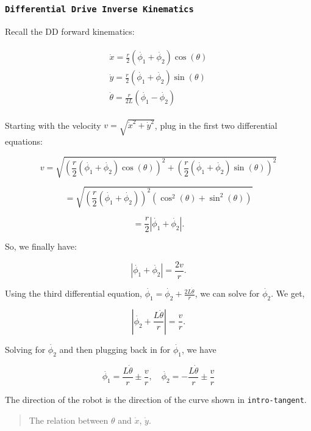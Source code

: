 \hypertarget{differential-drive-inverse-kinematics}{%
\subsubsection{\texorpdfstring{\texttt{Differential\ Drive\ Inverse\ Kinematics}}{Differential Drive Inverse Kinematics}}\label{differential-drive-inverse-kinematics}}

Recall the DD forward kinematics:

\[\begin{aligned}
\begin{array}{l}
 \dot{x} = \frac{r}{2} (\dot{\phi_1}+\dot{\phi_2})\cos(\theta) \\[5mm]
\dot{y} = \frac{r}{2} (\dot{\phi_1}+\dot{\phi_2})\sin(\theta) \\[5mm]
\dot{\theta} = \frac{r}{2L} (\dot{\phi_1}-\dot{\phi_2})
\end{array}
\end{aligned}\]

Starting with the velocity \(v = \sqrt{\dot{x}^2 + \dot{y}^2}\), plug in
the first two differential equations:

\[v = \sqrt{\left(\frac{r}{2} (\dot{\phi_1}+\dot{\phi_2})\cos(\theta)\right)^2 + \left(\frac{r}{2} (\dot{\phi_1}+\dot{\phi_2})\sin(\theta)\right)^2}\]

\[= \sqrt{\left(\frac{r}{2} (\dot{\phi_1}+\dot{\phi_2})\right)^2 \left(\cos^2(\theta) + \sin^2(\theta)\right)}\]

\[= \frac{r}{2} |\dot{\phi_1}+\dot{\phi_2}|.\]

So, we finally have:

\[|\dot{\phi_1}+\dot{\phi_2}| = \frac{2v}{r}.\]

Using the third differential equation,
\(\dot{\phi_1} = \dot{\phi_2} + \frac{2L\dot{\theta}}{r}\), we can solve
for \(\dot{\phi_2}\). We get,

\[|\dot{\phi_2} + \frac{L\dot{\theta}}{r}| = \frac{v}{r}.\]

Solving for \(\dot{\phi_2}\) and then plugging back in for
\(\dot{\phi_1}\), we have

\[\dot{\phi_1} =  \frac{L\dot{\theta}}{r} \pm \frac{v}{r}, \quad
\dot{\phi_2} = -\frac{L\dot{\theta}}{r} \pm \frac{v}{r}\]

The direction of the robot is the direction of the curve shown in
\texttt{intro-tangent}.

\begin{quote}
The relation between \(\theta\) and \(\dot{x}\), \(\dot{y}\).
\end{quote}

